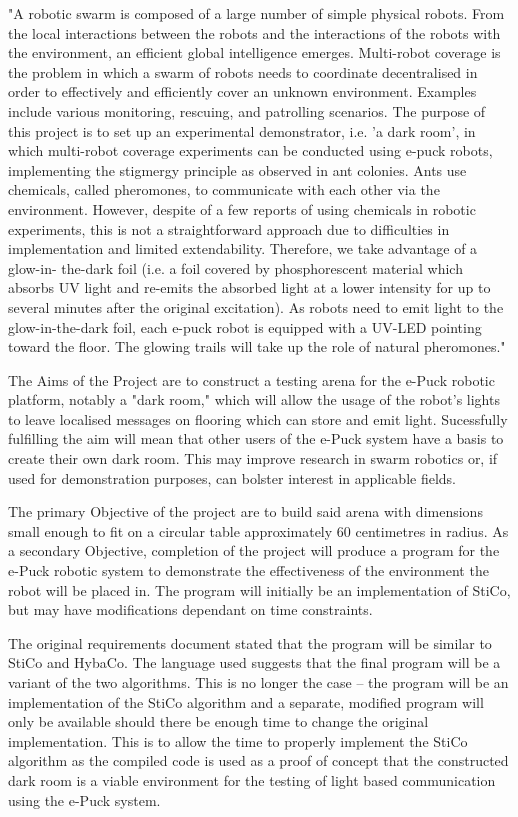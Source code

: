"A robotic swarm is composed of a large number of simple physical robots. From
the local interactions between the robots and the interactions of the robots
with the environment, an efficient global intelligence emerges. Multi-robot
coverage is the problem in which a swarm of robots needs to coordinate
decentralised in order to effectively and efficiently cover an unknown
environment. Examples include various monitoring, rescuing, and patrolling
scenarios. The purpose of this project is to set up an experimental
demonstrator, i.e. 'a dark room', in which multi-robot coverage experiments can
be conducted using e-puck robots, implementing the stigmergy principle as
observed in ant colonies. Ants use chemicals, called pheromones, to communicate
with each other via the environment. However, despite of a few reports of using
chemicals in robotic experiments, this is not a straightforward approach due to
difficulties in implementation and limited extendability. Therefore, we take
advantage of a glow-in- the-dark foil (i.e. a foil covered by phosphorescent
material which absorbs UV light and re-emits the absorbed light at a lower
intensity for up to several minutes after the original excitation). As robots
need to emit light to the glow-in-the-dark foil, each e-puck robot is equipped
with a UV-LED pointing toward the floor. The glowing trails will take up the
role of natural pheromones."

The Aims of the Project are to construct a testing arena for the e-Puck robotic 
platform, notably a "dark room," which will allow the usage of the robot's
lights to leave localised messages on flooring which can store and emit light.
Sucessfully fulfilling the aim will mean that other users of the e-Puck system
have a basis to create their own dark room.  This may improve research in swarm
robotics or, if used for demonstration purposes, can bolster interest in
applicable fields.

The primary Objective of the project are to build said arena with dimensions
small enough to fit on a circular table approximately 60 centimetres in radius.
As a secondary Objective, completion of the project will produce a program for
the e-Puck robotic system to demonstrate the effectiveness of the environment the robot will be placed in.  The program will initially be an implementation of
StiCo\cite{Ranjbar-Sahraei2012Demo}, but may have modifications dependant on
time constraints.

The original requirements document stated that the program will be similar to 
StiCo and HybaCo\cite{myReq}.  The language used suggests that the final
program will be a variant of the two algorithms.  This is no longer the case
-- the program will be an implementation of the StiCo algorithm and a separate,
modified program will only be available should there be enough time to
change the original implementation.  This is to allow the time to properly
implement the StiCo algorithm as the compiled code is used as a proof of
concept that the constructed dark room is a viable environment for the testing
of light based communication using the e-Puck system.

